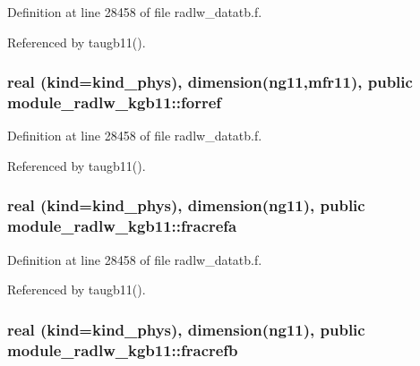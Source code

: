 Definition at line 28458 of file radlw\+\_\+datatb.\+f.



Referenced by taugb11().

\subsubsection[{\texorpdfstring{forref}{forref}}]{\setlength{\rightskip}{0pt plus 5cm}real (kind=kind\+\_\+phys), dimension(ng11,{\bf mfr11}), public module\+\_\+radlw\+\_\+kgb11\+::forref}\hypertarget{namespacemodule__radlw__kgb11_a9239d06fcd3fca0f13302c1ae4eb5a60}{}\label{namespacemodule__radlw__kgb11_a9239d06fcd3fca0f13302c1ae4eb5a60}


Definition at line 28458 of file radlw\+\_\+datatb.\+f.



Referenced by taugb11().

\subsubsection[{\texorpdfstring{fracrefa}{fracrefa}}]{\setlength{\rightskip}{0pt plus 5cm}real (kind=kind\+\_\+phys), dimension(ng11), public module\+\_\+radlw\+\_\+kgb11\+::fracrefa}\hypertarget{namespacemodule__radlw__kgb11_a5bf6552fb9c1e7c35729b2aea885306e}{}\label{namespacemodule__radlw__kgb11_a5bf6552fb9c1e7c35729b2aea885306e}


Definition at line 28458 of file radlw\+\_\+datatb.\+f.



Referenced by taugb11().

\subsubsection[{\texorpdfstring{fracrefb}{fracrefb}}]{\setlength{\rightskip}{0pt plus 5cm}real (kind=kind\+\_\+phys), dimension(ng11), public module\+\_\+radlw\+\_\+kgb11\+::fracrefb}\hypertarget{namespacemodule__radlw__kgb11_a0a89a2686ebc70a2c0d8577b89384a56}{}\label{namespacemodule__radlw__kgb11_a0a89a2686ebc70a2c0d8577b89384a56}


